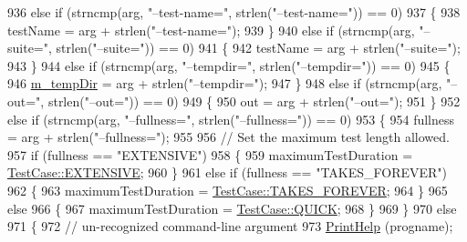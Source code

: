\begin{DoxyCode}
936       \textcolor{keywordflow}{else} \textcolor{keywordflow}{if} (strncmp(arg, \textcolor{stringliteral}{"--test-name="}, strlen(\textcolor{stringliteral}{"--test-name="})) == 0)
937         \{
938           testName = arg + strlen(\textcolor{stringliteral}{"--test-name="});
939         \}
940       \textcolor{keywordflow}{else} \textcolor{keywordflow}{if} (strncmp(arg, \textcolor{stringliteral}{"--suite="}, strlen(\textcolor{stringliteral}{"--suite="})) == 0)
941         \{
942           testName = arg + strlen(\textcolor{stringliteral}{"--suite="});
943         \}
944       \textcolor{keywordflow}{else} \textcolor{keywordflow}{if} (strncmp(arg, \textcolor{stringliteral}{"--tempdir="}, strlen(\textcolor{stringliteral}{"--tempdir="})) == 0)
945         \{
946           \hyperlink{classns3_1_1TestRunnerImpl_a659f2ebce866a2fc11e8dfee14b8b802}{m\_tempDir} = arg + strlen(\textcolor{stringliteral}{"--tempdir="});
947         \}
948       \textcolor{keywordflow}{else} \textcolor{keywordflow}{if} (strncmp(arg, \textcolor{stringliteral}{"--out="}, strlen(\textcolor{stringliteral}{"--out="})) == 0)
949         \{
950           out = arg + strlen(\textcolor{stringliteral}{"--out="});
951         \}
952       \textcolor{keywordflow}{else} \textcolor{keywordflow}{if} (strncmp(arg, \textcolor{stringliteral}{"--fullness="}, strlen(\textcolor{stringliteral}{"--fullness="})) == 0)
953         \{
954           fullness = arg + strlen(\textcolor{stringliteral}{"--fullness="});
955 
956           \textcolor{comment}{// Set the maximum test length allowed.}
957           \textcolor{keywordflow}{if} (fullness == \textcolor{stringliteral}{"EXTENSIVE"})
958             \{
959               maximumTestDuration = \hyperlink{classns3_1_1TestCase_a11f6f57c21a0d32e605d192a89550f91a52858a023576ded5148030f08c1c2419}{TestCase::EXTENSIVE};
960             \}
961           \textcolor{keywordflow}{else} \textcolor{keywordflow}{if} (fullness == \textcolor{stringliteral}{"TAKES\_FOREVER"})
962             \{
963               maximumTestDuration = \hyperlink{classns3_1_1TestCase_a11f6f57c21a0d32e605d192a89550f91a88f5459fbc31d63d7cadbbf69e604898}{TestCase::TAKES\_FOREVER};
964             \}
965           \textcolor{keywordflow}{else}
966             \{
967               maximumTestDuration = \hyperlink{classns3_1_1TestCase_a11f6f57c21a0d32e605d192a89550f91ac2f47fb646e77f4ce7d662a69120965f}{TestCase::QUICK};
968             \}
969         \}
970       \textcolor{keywordflow}{else}
971         \{
972           \textcolor{comment}{// un-recognized command-line argument}
973           \hyperlink{classns3_1_1TestRunnerImpl_a6ebd6ac3d170ea7969f428ed305a49d1}{PrintHelp} (progname);

\end{DoxyCode}

